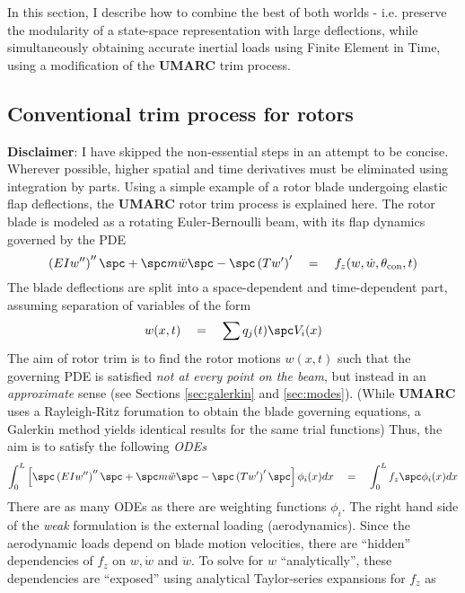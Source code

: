 In this section, I describe how to combine the best of both worlds - i.e. preserve the modularity of a state-space representation with large deflections, while simultaneously obtaining accurate inertial loads using Finite Element in Time, using a modification of the \textbf{UMARC} trim process.

\subsection{\textbf{Conventional trim process for rotors}}
\textbf{Disclaimer}: I have skipped the non-essential steps in an attempt to be concise. Wherever possible, higher spatial and time derivatives must be eliminated using integration by parts. Using a simple example of a rotor blade undergoing elastic flap deflections, the \textbf{UMARC} rotor trim process is explained here. The rotor blade is modeled as a rotating Euler-Bernoulli beam, with its flap dynamics governed by the PDE
\begin{equation}
\left( EI w''\right)'' \spc + \spc m\ddot{w} \spc - \spc \left(T w'\right)' \quad = \quad f_z(w, \dot{w}, \theta_\textrm{con}, t)
\end{equation} 
The blade deflections are split into a space-dependent and time-dependent part, assuming separation of variables of the form 
\begin{equation}
w(x,t) \quad = \quad \sum q_j(t) \spc V_i(x)
\end{equation}
The aim of rotor trim is to find the rotor motions $w(x,t)$ such that the governing PDE is satisfied \textit{not at every point on the beam}, but instead in an \textit{approximate} sense (see Sections \ref{sec:galerkin} and \ref{sec:modes}). (While \textbf{UMARC} uses a Rayleigh-Ritz forumation to obtain the blade governing equations, a Galerkin method yields identical results for the same trial functions) Thus, the aim is to satisfy the following \textit{ODEs} 
\begin{equation}
\int_0^L \left[\spc \left( EI w''\right)'' \spc + \spc m\ddot{w} \spc - \spc \left(T w'\right)' \spc \right] \phi_i(x) dx \quad = \quad \int_0^L f_z \spc \phi_i(x) dx 
\end{equation}
There are as many ODEs as there are weighting functions $\phi_i$. The right hand side of the \textit{weak} formulation is the external loading (aerodynamics). Since the aerodynamic loads depend on blade motion velocities, there are ``hidden'' dependencies of $f_z$ on $w, \dot{w}$ and $\ddot{w}$. To solve for $w$ ``analytically'', these dependencies are ``exposed'' using analytical Taylor-series expansions for $f_z$ as 
